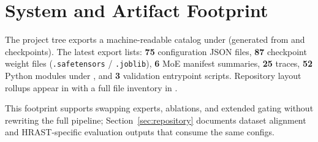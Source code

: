 \section{System and Artifact Footprint}
\label{sec:artifacts}

The project tree exports a machine-readable catalog under  (generated from  and checkpoints). The latest export lists: \textbf{75} configuration JSON files, \textbf{87} checkpoint weight files (\texttt{.safetensors} / \texttt{.joblib}), \textbf{6} MoE manifest summaries, \textbf{25}  traces, \textbf{52} Python modules under , and \textbf{3} validation entrypoint scripts. Repository layout rollups appear in  with a full file inventory in .

This footprint supports swapping experts, ablations, and extended gating without rewriting the full pipeline; Section~\ref{sec:repository} documents dataset alignment and HRAST-specific evaluation outputs that consume the same configs.
